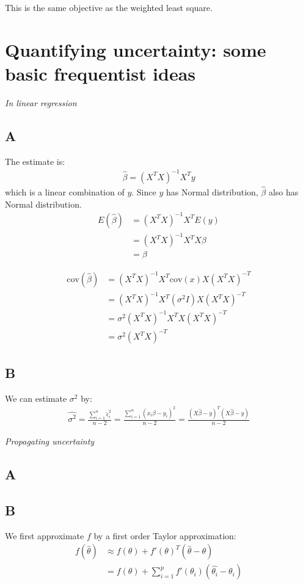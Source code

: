 \documentclass{article}
\begin{document}
This is the same objective as the weighted least square.

\section{Quantifying uncertainty: some basic frequentist ideas}
\textit{In linear regression}
\subsection*{A}

The estimate is:
\begin{align*}
\hat{\beta} = (X^TX)^{-1}X^Ty
\end{align*}
which is a linear combination of \(y\). Since \(y\) has Normal distribution, \(\hat{\beta}\) also has Normal distribution.
\begin{align*}
E(\hat{\beta}) &= (X^TX)^{-1}X^T E(y)\\
&= (X^TX)^{-1}X^T X\beta\\
&= \beta
\end{align*}

\begin{align*}
\mbox{cov}(\hat{\beta}) &= (X^TX)^{-1}X^T \mbox{cov}(x) X(X^TX)^{-T}\\
&= (X^TX)^{-1}X^T (\sigma^2 I) X(X^TX)^{-T}\\
&= \sigma^2 (X^TX)^{-1}X^T  X(X^TX)^{-T}\\
&= \sigma^2 (X^TX)^{-T}
\end{align*}

\subsection*{B}
We can estimate \(\sigma^2\) by:
\begin{align*}
\hat{\sigma^2} = \frac{\sum_{i=1}^n\hat{\epsilon}_i^2}{n-2} = \frac{\sum_{i=1}^n(x_i\hat{\beta} - y_i)^2}{n-2} = \frac{(X\hat{\beta} - y)^T(X\hat{\beta} - y)}{n-2}
\end{align*}

\textit{Propagating uncertainty}
\subsection*{A}

\subsection*{B}
We first approximate \(f\) by a first order Taylor approximation:
\begin{align*}
f(\hat{\theta}) &\approx f(\theta) + f'(\theta)^T(\hat{\theta} - \theta)\\
&= f(\theta) + \sum_{i=1}^p f'(\theta_i) (\hat{\theta_i} - \theta_i)
\end{align*}
\end{document}
